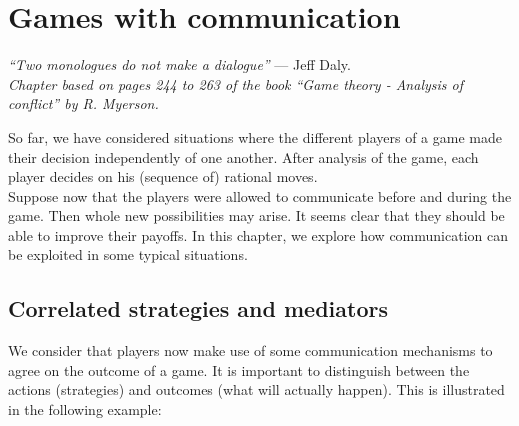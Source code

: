 \ifx \globalmark \undefined %
	
\else 	
\fi


\chapter{Games with communication}
{\large{\itshape
``Two monologues do not make a dialogue''} --- Jeff Daly.\\
}
\label{chap:Cor}
  {\small{\itshape
Chapter based on pages 244 to 263 of the book  ``Game theory - Analysis of conflict'' by R. Myerson.}\\
}


So far, we have considered situations where the different players of a game made their decision independently of one another. After analysis of the game, each player decides on his (sequence of) rational moves.\\
Suppose now that the players were allowed to communicate before and during the game. Then whole new possibilities may arise. It seems clear that they should be able to improve their payoffs. In this chapter, we explore how communication can be exploited in some typical situations.

\section{Correlated strategies and mediators}

We consider that players now  make use of some communication mechanisms to agree on the outcome of a game. It is important to distinguish between the actions (strategies) and outcomes (what will actually happen). This is illustrated in the following example: 

